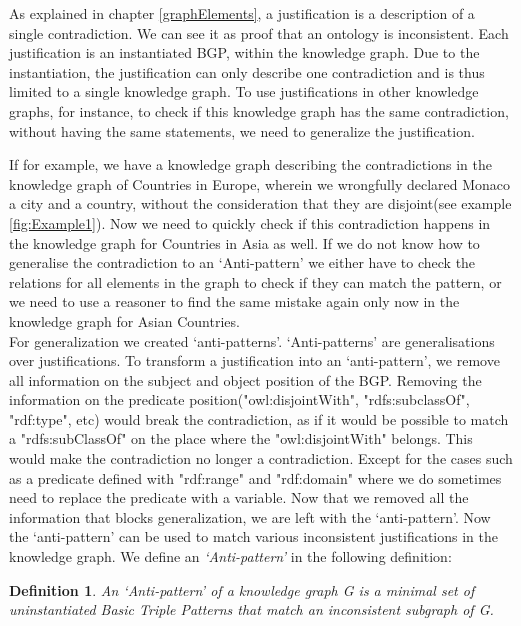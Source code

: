 \documentclass[11pt,letterpaper ,oneside ]{book}
\newtheorem{definition}{Definition}
\begin{document}
	As explained in chapter \ref{graphElements}, a justification is a description of a single contradiction. We can see it as proof that an ontology is inconsistent. Each justification is an instantiated BGP, within the knowledge graph. Due to the instantiation, the justification can only describe one contradiction and is thus limited to a single knowledge graph. To use justifications in other knowledge graphs, for instance, to check if this knowledge graph has the same contradiction, without having the same statements, we need to generalize the justification.
	
	If for example, we have a knowledge graph describing the contradictions in the knowledge graph of Countries in Europe, wherein we wrongfully declared Monaco a city and a country, without the consideration that they are disjoint(see example \ref{fig:Example1}). Now we need to quickly check if this contradiction happens in the knowledge graph for Countries in Asia as well. If we do not know how to generalise the contradiction to an `Anti-pattern' we either have to check the relations for all elements in the graph to check if they can match the pattern, or we need to use a reasoner to find the same mistake again only now in the knowledge graph for Asian Countries.\\
	
	For generalization we created `anti-patterns'. `Anti-patterns' are generalisations over justifications. To transform a justification into an `anti-pattern', we remove all information on the subject and object position of the BGP. Removing the information on the predicate position("owl:disjointWith", "rdfs:subclassOf", "rdf:type", etc) would break the contradiction, as if it would be possible to match a "rdfs:subClassOf" on the place where the "owl:disjointWith" belongs. This would make the contradiction no longer a contradiction. Except for the cases such as a predicate defined with "rdf:range" and "rdf:domain" where we do sometimes need to replace the predicate with a variable. 
	Now that we removed all the information that blocks generalization, we are left with the `anti-pattern'. Now the `anti-pattern' can be used to match various inconsistent justifications in the knowledge graph. We define an \textit{`Anti-pattern'} in the following definition:\\
	
	\begin{definition} 
		An \textit{`Anti-pattern'} of a knowledge graph G is a minimal set of uninstantiated Basic Triple Patterns that match an inconsistent subgraph of G.
	\end{definition}
	
\end{document}

